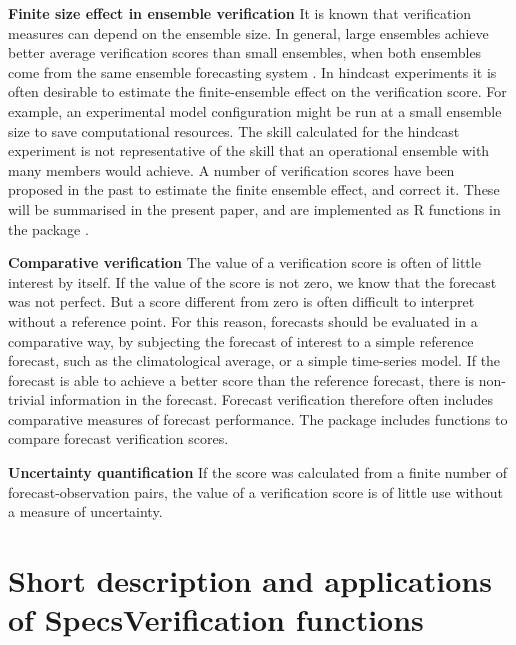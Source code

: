\documentclass[article]{jss}\usepackage{graphicx, color}
\begin{document}
{\bf Finite size effect in ensemble verification}
It is known that verification measures can depend on the ensemble size.
In general, large ensembles achieve better average verification scores than small ensembles, when both ensembles come from the same ensemble forecasting system \citep{buizza1998impact}.
In hindcast experiments it is often desirable to estimate the finite-ensemble effect on the verification score. 
For example, an experimental model configuration might be run at a small ensemble size to save computational resources. 
The skill calculated for the hindcast experiment is not representative of the skill that an operational ensemble with many members would achieve.
A number of verification scores have been proposed in the past to estimate the finite ensemble effect, and correct it.
These will be summarised in the present paper, and are implemented as R functions in the package .


{\bf Comparative verification}
The value of a verification score is often of little interest by itself.
If the value of the score is not zero, we know that the forecast was not perfect.
But a score different from zero is often difficult to interpret without a reference point.
For this reason, forecasts should be evaluated in a comparative way, by subjecting the forecast of interest to a simple reference forecast, such as the climatological average, or a simple time-series model.
If the forecast is able to achieve a better score than the reference forecast, there is non-trivial information in the forecast.
Forecast verification therefore often includes comparative measures of forecast performance.
The package  includes functions to compare forecast verification scores.


{\bf Uncertainty quantification}
If the score was calculated from a finite number of forecast-observation pairs,  the value of a verification score is of little use without a measure of uncertainty.




\section{Short description and applications of SpecsVerification functions}
\end{document}

